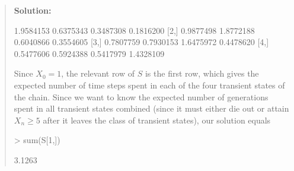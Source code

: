 \documentclass{article}
\begin{document}
\begin{enumerate}
\begin{enumerate}
\begin{quotation}{\bf Solution:}
\begin{Schunk}
\begin{Soutput}
          [,1]      [,2]      [,3]      [,4]
[1,] 1.9584153 0.6375343 0.3487308 0.1816200
[2,] 0.9877498 1.8772188 0.6040866 0.3554605
[3,] 0.7807759 0.7930153 1.6475972 0.4478620
[4,] 0.5477606 0.5924388 0.5417979 1.4328109
\end{Soutput}
\end{Schunk}
  Since $X_0=1$, the relevant row of $S$ is the first row, which gives the expected number of time
  steps spent in each of the four transient states of the chain.  Since we want to know the expected
  number of generations spent in all transient states combined (since it must either die out or
  attain $X_n\ge 5$ after it leaves the class of transient states), our solution equals
\begin{Schunk}
\begin{Sinput}
> sum(S[1,])
\end{Sinput}
\begin{Soutput}
[1] 3.1263
\end{Soutput}
\end{Schunk}
  \end{quotation}


\end{enumerate}
\end{enumerate}
\end{document}
